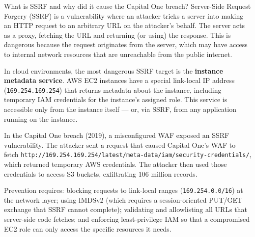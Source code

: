 \documentclass[11pt,a4paper]{article}
\begin{document}
\begin{curiobox}{What is SSRF and why did it cause the Capital One breach?}
Server-Side Request Forgery (SSRF) is a vulnerability where an attacker tricks a server into making an HTTP request to an arbitrary URL on the attacker's behalf. The server acts as a proxy, fetching the URL and returning (or using) the response. This is dangerous because the request originates from the server, which may have access to internal network resources that are unreachable from the public internet.

In cloud environments, the most dangerous SSRF target is the \textbf{instance metadata service}. AWS EC2 instances have a special link-local IP address (\texttt{169.254.169.254}) that returns metadata about the instance, including temporary IAM credentials for the instance's assigned role. This service is accessible only from the instance itself --- or, via SSRF, from any application running on the instance.

In the Capital One breach (2019), a misconfigured WAF exposed an SSRF vulnerability. The attacker sent a request that caused Capital One's WAF to fetch \texttt{http://169.254.169.254/latest/meta-data/iam/security-credentials/}, which returned temporary AWS credentials. The attacker then used those credentials to access S3 buckets, exfiltrating 106 million records.

Prevention requires: blocking requests to link-local ranges (\texttt{169.254.0.0/16}) at the network layer; using IMDSv2 (which requires a session-oriented PUT/GET exchange that SSRF cannot complete); validating and allowlisting all URLs that server-side code fetches; and enforcing least-privilege IAM so that a compromised EC2 role can only access the specific resources it needs.
\end{curiobox}
\end{document}
